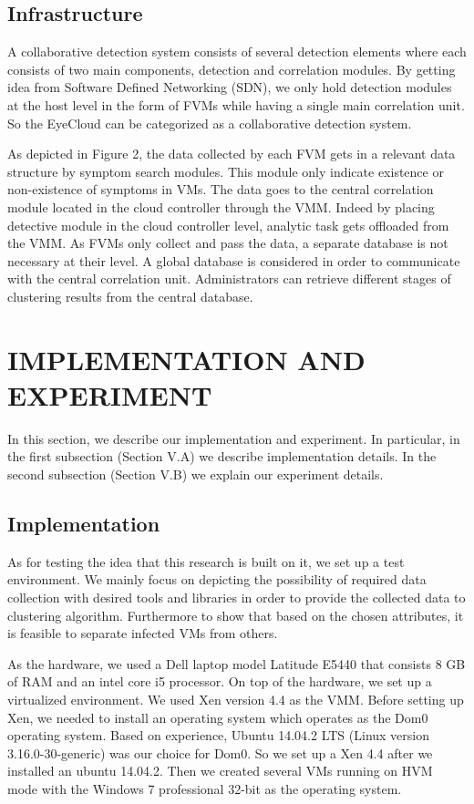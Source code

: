\documentclass[conference]{IEEEtran}
\begin{document}
\subsection{Infrastructure}
A collaborative detection system consists of several detection elements where each consists of two main components, detection and correlation modules. By getting idea from Software Defined Networking (SDN), we only hold detection modules at the host level in the form of FVMs while having a single main correlation unit. So the EyeCloud can be categorized as a collaborative detection system. 

As depicted in Figure 2, the data collected by each FVM gets in a relevant data structure by symptom search modules. This module only indicate existence or non-existence of symptoms in VMs. The data goes to the central correlation module located in the cloud controller through the VMM. Indeed by placing detective module in the cloud controller level, analytic task gets offloaded from the VMM. As FVMs only collect and pass the data, a separate database is not necessary at their level. A global database is considered in order to communicate with the central correlation unit. Administrators can retrieve different stages of clustering results from the central database.
 
\section{IMPLEMENTATION AND EXPERIMENT}
In this section, we describe our implementation and experiment. In particular, in the first subsection (Section V.A) we describe implementation details. In the second subsection (Section V.B) we explain our experiment details.
\subsection{Implementation}
As for testing the idea that this research is built on it, we set up a test environment. We mainly focus on depicting the possibility of required data collection with desired tools and libraries in order to provide the collected data to clustering algorithm. Furthermore to show that based on the chosen attributes, it is feasible to separate infected VMs from others. 

As the hardware, we used a Dell laptop model Latitude E5440 that consists 8 GB of RAM and an intel core i5 processor. On top of the hardware, we set up a virtualized environment. We used Xen version 4.4 as the VMM. Before setting up Xen, we needed to install an operating system which operates as the Dom0 operating system. Based on experience, Ubuntu 14.04.2 LTS (Linux version 3.16.0-30-generic) was our choice for Dom0. So we set up a Xen 4.4 after we installed an ubuntu 14.04.2. Then we created several VMs running on HVM mode with the Windows 7 professional 32-bit as the operating system. 
\end{document}
